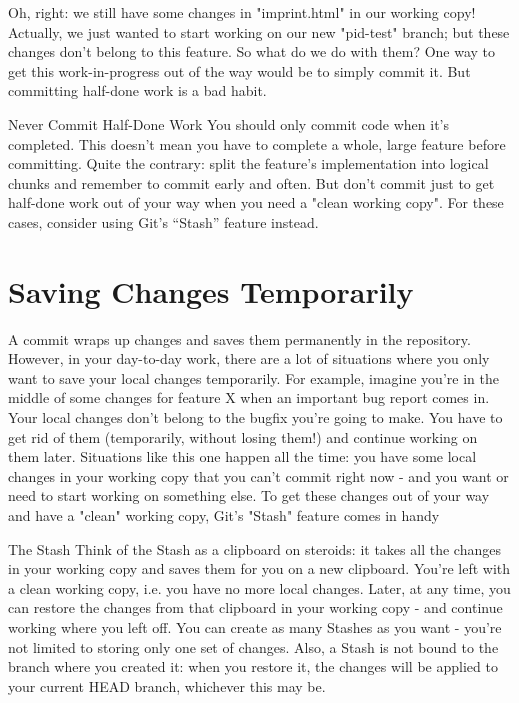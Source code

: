 \documentclass{article}
\begin{document}
Oh, right: we still have some changes in "imprint.html" in our working copy! Actually, we just wanted to start working on our new "pid-test" branch; but these changes don't belong to this feature. So what do we do with them? One way to get this work-in-progress out of the way would be to simply commit it. But committing half-done work is a bad habit.

\begin{golden-rule}Never Commit Half-Done Work
\newline\newline
You should only commit code when it’s completed. This doesn’t mean you have to complete a whole, large feature before committing. Quite the contrary: split the feature’s implementation into logical chunks and remember to commit early and often. But don’t commit just to get half-done work out of your way when you need a "clean working copy". For these cases, consider using Git’s “Stash” feature instead.
\end{golden-rule}

\section{Saving Changes Temporarily}
A commit wraps up changes and saves them permanently in the repository. However, in your day-to-day work, there are a lot of situations where you only want to save your local changes temporarily. For example, imagine you're in the middle of some changes for feature X when an important bug report comes in. Your local changes don't belong to the bugfix you're going to make. You have to get rid of them (temporarily, without losing them!) and continue working on them later.
\newline\newline
Situations like this one happen all the time: you have some local changes in your working copy that you can't commit right now - and you want or need to start working on something else. To get these changes out of your way and have a "clean" working copy, Git's "Stash" feature comes in handy

\begin{concept}
The Stash
\newline\newline 
Think of the Stash as a clipboard on steroids: it takes all the changes in your working copy and saves them for you on a new clipboard. You're left with a clean working copy, i.e. you have no more local changes.
\newline\newline 
Later, at any time, you can restore the changes from that clipboard in your working copy - and continue working where you left off.
\newline\newline 
You can create as many Stashes as you want - you're not limited to storing only one set of changes. Also, a Stash is not bound to the branch where you created it: when you restore it, the changes will be applied to your current HEAD branch, whichever this may be.
\end{concept}
\end{document}

